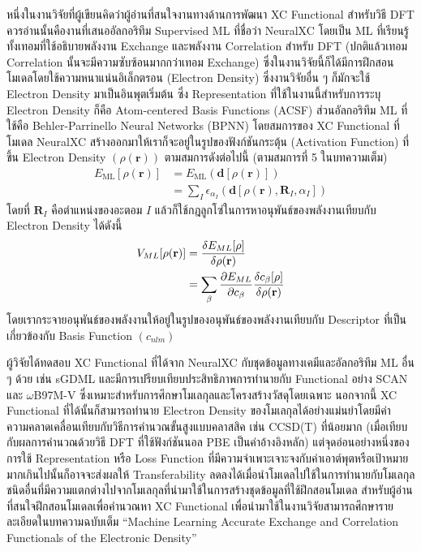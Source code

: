 หนึ่งในงานวิจัยที่ผู้เขียนคิดว่าผู้อ่านที่สนใจงานทางด้านการพัฒนา XC Functional สำหรับวิธี DFT ควรอ่านนั้นคืองานที่เสนออัลกอริทึม Supervised ML ที่ชื่อว่า NeuralXC\autocite{dick2020} โดยเป็น ML ที่เรียนรู้ทั้งเทอมที่ใช้อธิบายพลังงาน Exchange และพลังงาน Correlation สำหรับ DFT (ปกติแล้วเทอม Correlation นั้นจะมีความซับซ้อนมากกว่าเทอม Exchange) ซึ่งในงานวิจัยนี้ก็ได้มีการฝึกสอนโมเดลโดยใช้ความหนาแน่นอิเล็กตรอน (Electron Density) ซึ่งงานวิจัยอื่น ๆ ก็มักจะใช้ Electron Density มาเป็นอินพุตเริ่มต้น ซึ่ง Representation ที่ใช้ในงานนี้สำหรับการระบุ Electron Density ก็คือ Atom-centered Basis Functions (ACSF) ส่วนอัลกอริทึม ML ที่ใช้คือ Behler-Parrinello Neural Networks (BPNN) โดยสมการของ XC Functional ที่โมเดล NeuralXC สร้างออกมาให้เราก็จะอยู่ในรูปของฟังก์ชันกระตุ้น (Activation Function) ที่ขึ้น Electron Density $(\rho ({\bm{r}}))$ ตามสมการดังต่อไปนี้ (ตามสมการที่ 5 ในบทความเต็ม)
%
\begin{align}
    E_{\text{ML}} [\rho ({\bm{r}})] & = E_{\text{ML}}({\bm{d}}[\rho ({\bm{r}})]) \nonumber \\
                                    & = \sum_{I}{\epsilon}_{\alpha_{I}}(\bm{d}[\rho (\bm{r}), {\bm{R}}_{I}, \alpha_{I}])
\end{align}
%
\noindent โดยที่ $\bm{R}_{I}$ คือตำแหน่งของอะตอม $I$ แล้วก็ใช้กฎลูกโซ่ในการหาอนุพันธ์ของพลังงานเทียบกับ Electron Density ได้ดังนี้
%
\begin{align}
    {V}_{{{M}}L}[\rho ({\bf{r}})] & = \frac{\delta {E}_{{{M}}L}[\rho ]}{\delta \rho ({\bf{r}})} \nonumber \\
                                  & = \sum_{\beta} \frac{\partial {E}_{{{M}}L}}{\partial {c}_{\beta }}
    \frac{\delta {c}_{\beta }[\rho ]}{\delta \rho ({\bf{r}})}
\end{align}
%
\noindent โดยเรากระจายอนุพันธ์ของพลังงานให้อยู่ในรูปของอนุพันธ์ของพลังงานเทียบกับ Descriptor ที่เป็นเกี่ยวข้องกับ Basis Function $(c_{nlm})$

ผู้วิจัยได้ทดสอบ XC Functional ที่ได้จาก NeuralXC กับชุดข้อมูลทางเคมีและอัลกอริทึม ML อื่น ๆ ด้วย เช่น sGDML และมีการเปรียบเทียบประสิทธิภาพการทำนายกับ Functional อย่าง SCAN และ $\omega$B97M-V ซึ่งเหมาะสำหรับการศึกษาโมเลกุลและโครงสร้างวัสดุโดยเฉพาะ นอกจากนี้ XC Functional ที่ได้นั้นก็สามารถทำนาย Electron Density ของโมเลกุลได้อย่างแม่นยำโดยมีค่าความคลาดเคลื่อนเทียบกับวิธีการคำนวณขั้นสูงแบบคลาสสิค เช่น CCSD(T) ที่น้อยมาก (เมื่อเทียบกับผลการคำนวณด้วยวิธี DFT ที่ใช้ฟังก์ชันนอล PBE เป็นค่าอ้างอิงหลัก) แต่จุดอ่อนอย่างหนึ่งของการใช้ Representation หรือ Loss Function ที่มีความจำเพาะเจาะจงกับค่าเอาต์พุตหรือเป้าหมายมากเกินไปนั้นก็อาจจะส่งผลให้ Transferability ลดลงได้เมื่อนำโมเดลไปใช้ในการทำนายกับโมเลกุลชนิดอื่นที่มีความแตกต่างไปจากโมเลกุลที่นำมาใช้ในการสร้างชุดข้อมูลที่ใช้ฝึกสอนโมเดล สำหรับผู้อ่านที่สนใจฝึกสอนโมเดลเพื่อคำนวณหา XC Functional เพื่อนำมาใช้ในงานวิจัยสามารถศึกษารายละเอียดในบทความฉบับเต็ม \enquote{Machine Learning Accurate Exchange and Correlation Functionals of the Electronic Density}

